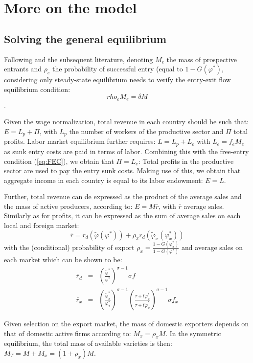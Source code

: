\documentclass[a4paper,11pt]{article}
\begin{document}
\section{More on the model \label{app:theoretical_model}}

\subsection{Solving the general equilibrium}

Following \cite{melitz} and the subsequent literature, denoting $M_e$ the mass of prospective entrants and $\rho_e$ the probability of successful entry (equal to $1-G(\varphi^\ast)$, considering only steady-state equilibrium needs to verify the entry-exit flow equilibrium condition:
$$rho_e M_e = \delta M$$.

Given the wage normalization, total revenue in each country should be such that: $E = L_p+\Pi$, with $L_p$ the number of workers of the productive sector and $\Pi$ total profits. Labor market equilibrium further requires: $L = L_p+ L_e$ with $L_e = f_eM_e$ as sunk entry costs are paid in terms of labor. Combining this with the free-entry condition (\ref{eq:FEC}), we obtain that $\Pi = L_e$: Total profits in the productive sector are used to pay the entry sunk costs. Making use of this, we obtain that aggregate income in each country is equal to its labor endowment: $E =L$.

Further, total revenue can de expressed as the product of the average sales and the mass of active producers, according to: $E = M\bar{r}$, with $\bar{r}$ average sales. Similarly as for profits, it can be expressed as the sum of average sales on each local and foreign market:
$$\bar{r} = r_d(\widetilde{\varphi}(\varphi^\ast))+ \rho_x r_d(\widetilde{\varphi}_x(\varphi_x^\ast))$$
\noindent with the (conditional) probability of export $\rho_x = \frac{1-G(\varphi^\ast_x)}{1-G(\varphi^\ast)}$ and average sales on each market which can be shown to be:
\begin{eqnarray*}
\bar{r}_d &=& \left(\frac{\widetilde{\varphi}^\ast}{\varphi^\ast}\right)^{\sigma-1} \sigma f \\
\bar{r}_x &=& \left(\frac{\widetilde{\varphi}_x^\ast}{\varphi_x^\ast}\right)^{\sigma-1}\left(\frac{\tau+ t \varphi^\ast_x}{\tau+ t \widetilde{\varphi}^\ast_x}\right)^{\sigma-1} \sigma f_x
\end{eqnarray*}

Given selection on the export market, the mass of domestic exporters depends on that of domestic active firms according to: $M_x = \rho_x M$. In the symmetric equilibrium, the total mass of available varieties is then: $M_T= M+M_x = (1+\rho_x)M$.
\end{document}
